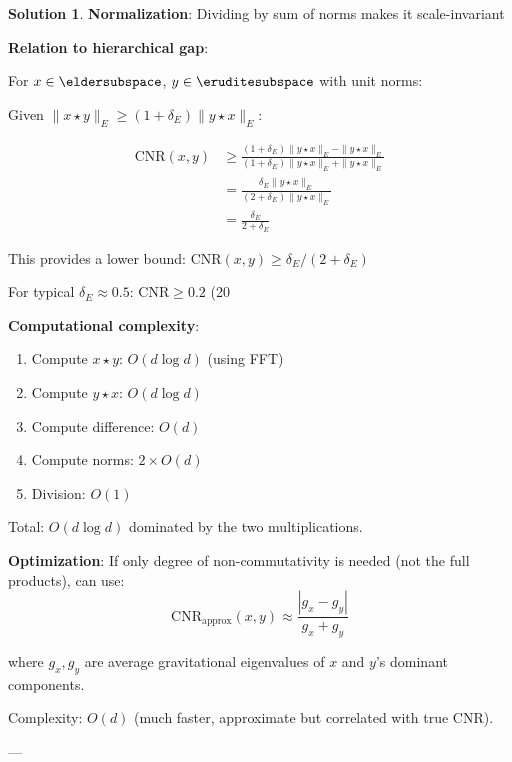 \documentclass[12pt,a4paper]{book}
\theoremstyle{definition}
\newtheorem{solution}{Solution}[section]
\theoremstyle{remark}
\begin{document}
\begin{solution}
\textbf{Normalization}: Dividing by sum of norms makes it scale-invariant

\textbf{Relation to hierarchical gap}:

For $x \in \eldersubspace$, $y \in \eruditesubspace$ with unit norms:

Given $\|x \star y\|_E \geq (1+\delta_E) \|y \star x\|_E$:

\begin{align}
\text{CNR}(x,y) &\geq \frac{(1+\delta_E)\|y \star x\|_E - \|y \star x\|_E}{(1+\delta_E)\|y \star x\|_E + \|y \star x\|_E} \\
&= \frac{\delta_E \|y \star x\|_E}{(2+\delta_E)\|y \star x\|_E} \\
&= \frac{\delta_E}{2 + \delta_E}
\end{align}

This provides a lower bound: $\text{CNR}(x,y) \geq \delta_E/(2+\delta_E)$

For typical $\delta_E \approx 0.5$: $\text{CNR} \geq 0.2$ (20%

\textbf{Computational complexity}:

\begin{enumerate}
\item Compute $x \star y$: $O(d \log d)$ (using FFT)
\item Compute $y \star x$: $O(d \log d)$
\item Compute difference: $O(d)$
\item Compute norms: $2 \times O(d)$
\item Division: $O(1)$
\end{enumerate}

Total: $O(d \log d)$ dominated by the two multiplications.

\textbf{Optimization}: If only degree of non-commutativity is needed (not the full products), can use:
$$\text{CNR}_{\text{approx}}(x,y) \approx \frac{|g_x - g_y|}{g_x + g_y}$$

where $g_x, g_y$ are average gravitational eigenvalues of $x$ and $y$'s dominant components.

Complexity: $O(d)$ (much faster, approximate but correlated with true CNR).
\end{solution}

---
\end{document}
